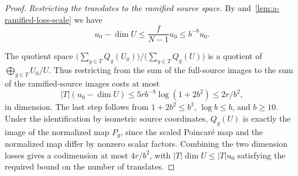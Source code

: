 \begin{proof}
\emph{Restricting the translates to the ramified source space.}
By  and~\ref{lem:a-ramified-loss-scale} we have
\[
 u_0-\dim U\le \frac{f}{N-1}u_0\le b^{-8}u_0.
\]

The quotient space $\bigl(\sum_{g\in T}Q_g(U_0)\bigr)\big/\bigl(\sum_{g\in T}Q_g(U)\bigr)$ is
a quotient of $\bigoplus_{g\in T}U_0/U$. Thus restricting from the sum of the full-source images to the sum of the ramified-source images
costs at most
\[
 |T|(u_0-\dim U)
 \le 5r b^{-8}\log(1+2b^2)
 \le 2r/b^2 ,
\]
in dimension. The last step follows from $1+2b^2\le b^3$, $\log b\le b$, and $b\ge10$.
Under the identification by isometric source coordinates, $Q_g(U)$ is exactly the image of the normalized map $P_g$,
since the scaled Poincaré map and the normalized map differ by nonzero scalar factors.
Combining the two dimension losses gives a codimension at most $4r/b^2$, with $|T|\dim U\le |T|u_0$ satisfying the required bound on the number of translates.
\end{proof}
